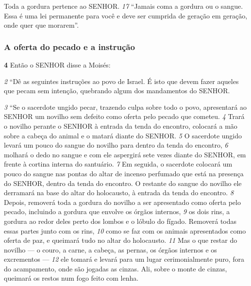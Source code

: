 \smallskip
Toda a gordura pertence ao SENHOR.
\textit{\tiny 17}
“Jamais coma a gordura ou o sangue. Essa é uma lei permanente para você e
deve ser cumprida de geração em geração, onde quer que morarem”.
  
\bigskip
\subsubsection*{A oferta do pecado e a instrução}
\textbf{\large 4} Então o SENHOR disse a Moisés: 

\smallskip
\textit{\tiny 2} 
“Dê as seguintes instruções ao povo de Israel.
É isto que devem fazer aqueles que pecam sem intenção, quebrando algum dos
mandamentos do SENHOR. 

\smallskip
\textit{\tiny 3} 
“Se o sacerdote ungido pecar, trazendo culpa sobre todo o povo, apresentará
ao SENHOR um novilho sem defeito como oferta pelo pecado que cometeu. 
\textit{\tiny 4} 
Trará
o novilho perante o SENHOR à entrada da tenda do encontro, colocará a mão sobre
a cabeça do animal e o matará diante do SENHOR. 
\textit{\tiny 5} 
O sacerdote ungido levará um
pouco do sangue do novilho para dentro da tenda do encontro, 
\textit{\tiny 6} 
molhará o dedo
no sangue e com ele aspergirá sete vezes diante do SENHOR, em frente à cortina
interna do santuário. 
\textit{\tiny 7} 
Em seguida, o sacerdote colocará um pouco do sangue nas
pontas do altar de incenso perfumado que está na presença do SENHOR, dentro da
tenda do encontro. O restante do sangue do novilho ele derramará na base do
altar do holocausto, à entrada da tenda do encontro. 
\textit{\tiny 8} 
Depois, removerá toda a
gordura do novilho a ser apresentado como oferta pelo pecado, incluindo a
gordura que envolve os órgãos internos, 
\textit{\tiny 9} 
os dois rins, a gordura ao redor deles
perto dos lombos e o lóbulo do fígado. Removerá todas essas partes junto com os
rins, 
\textit{\tiny 10}
como se faz com os animais apresentados como oferta de paz, e queimará
tudo no altar do holocausto. 
\textit{\tiny 11}
Mas o que restar do novilho — o couro, a carne, a
cabeça, as pernas, os órgãos internos e os excrementos — 
\textit{\tiny 12}
ele tomará e levará
para um lugar cerimonialmente puro, fora do acampamento, onde são jogadas as
cinzas. Ali, sobre o monte de cinzas, queimará os restos num fogo feito com
lenha.
   
